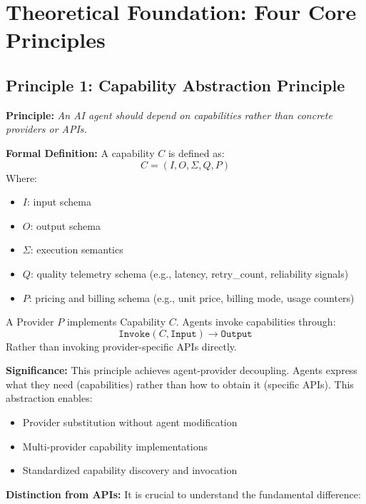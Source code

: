 \section{Theoretical Foundation: Four Core Principles}

\subsection{Principle 1: Capability Abstraction Principle}

\textbf{Principle:} \emph{An AI agent should depend on capabilities rather than concrete providers or APIs.}

\textbf{Formal Definition:} A capability $C$ is defined as:
\[
C = (I, O, \Sigma, Q, P)
\]
Where:
\begin{itemize}
    \item $I$: input schema
    \item $O$: output schema
    \item $\Sigma$: execution semantics
    \item $Q$: quality telemetry schema (e.g., latency, retry\_count, reliability signals)
    \item $P$: pricing and billing schema (e.g., unit price, billing mode, usage counters)
\end{itemize}

A Provider $P$ implements Capability $C$. Agents invoke capabilities through:
\[
\texttt{Invoke}(C, \texttt{Input}) \rightarrow \texttt{Output}
\]
Rather than invoking provider-specific APIs directly.

\textbf{Significance:} This principle achieves agent-provider decoupling. Agents express what they need (capabilities) rather than how to obtain it (specific APIs). This abstraction enables:
\begin{itemize}
    \item Provider substitution without agent modification
    \item Multi-provider capability implementations
    \item Standardized capability discovery and invocation
\end{itemize}

\textbf{Distinction from APIs:} It is crucial to understand the fundamental difference:

